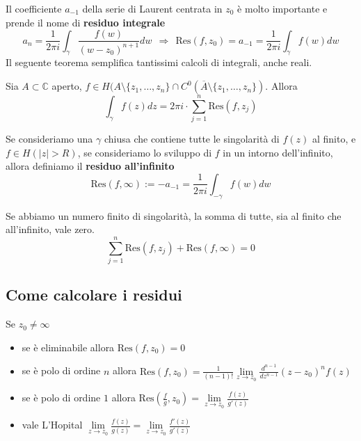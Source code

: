 Il coefficiente $a_{-1}$ della serie di Laurent centrata in $z_{0}$ è molto importante e prende il nome di \textbf{residuo integrale}
\begin{equation*}
a_{n} =\frac{1}{2\pi i}\int _{\gamma }\frac{f( w)}{( w-z_{0})^{n+1}} dw\ \ \Rightarrow \ \ \mathrm{Res}( f,z_{0}) =a_{-1} =\frac{1}{2\pi i}\int _{\gamma } f( w) dw
\end{equation*}
Il seguente teorema semplifica tantissimi calcoli di integrali, anche reali.
\begin{theorem}
 Sia $A\subset \mathbb{C}$ aperto, $f\in H( A\setminus \{z_{1} ,\dotsc ,z_{n}\} \cap C^{0}(\overline{A} \setminus \{z_{1} ,\dotsc ,z_{n}\})$. Allora
\begin{equation*}
\boxed{\int _{\gamma } f( z) dz=2\pi i\cdotp \sum\limits ^{n}_{j=1}\mathrm{Res}( f,z_{j})}
\end{equation*}
\end{theorem}
\begin{definition}
Se consideriamo una $\gamma $ chiusa che contiene tutte le singolarità di $f( z)$ al finito, e $f\in H(| z|  >R)$, se consideriamo lo sviluppo di $f$ in un intorno dell'infinito, allora definiamo il \textbf{residuo all'infinito}
\begin{equation*}
\mathrm{Res}( f,\infty ) :=-a_{-1} =\frac{1}{2\pi i}\int _{-\gamma } f( w) dw
\end{equation*}
\end{definition}
\begin{theorem}
Se abbiamo un numero finito di singolarità, la somma di tutte, sia al finito che all'infinito, vale zero.
\begin{equation*}
\sum\limits ^{n}_{j=1}\mathrm{Res}( f,z_{j}) +\mathrm{Res}( f,\infty ) =0
\end{equation*}
\end{theorem}
\subsection{Come calcolare i residui}

Se $z_{0} \neq \infty $
\begin{itemize}
\item se è eliminabile allora $\mathrm{Res}( f,z_{0}) =0$
\item se è polo di ordine $n$ allora $\mathrm{Res}( f,z_{0}) = \frac{1}{(n-1)!}\lim\limits _{z\rightarrow z_{0}}\frac{d^{n-1}}{dz^{n-1}}(z-z_0)^n f(z)$
\item se è polo di ordine $1$ allora $\mathrm{Res}\left(\frac{f}{g} ,z_{0}\right) =\lim\limits _{z\rightarrow z_{0}}\frac{f( z)}{g'( z)}$
\item vale L'Hopital $\lim\limits _{z\rightarrow z_{0}}\frac{f(z)}{g(z)} =\lim\limits _{z\rightarrow z_{0}}\frac{f'(z)}{g'(z)}$
\end{itemize}


